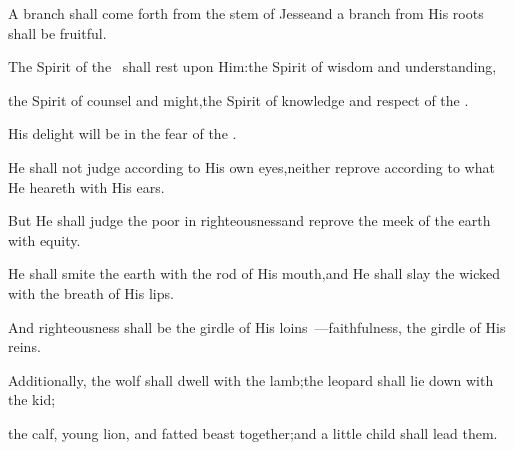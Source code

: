 
\begin{inparaenum}
  \pa{} A branch shall come forth from the stem of Jesse\pa{}and a branch from His roots shall be fruitful.%

  \pa{} The Spirit of the \lord\ shall rest upon Him:\pa{}the Spirit of wisdom and understanding,%

  \pa{}the Spirit of counsel and might,\pa{}the Spirit of knowledge and respect of the \lord.%

  \pa{} His delight will be in the fear of the \lord.%

  \pa{}He shall not judge according to His own eyes,\pa{}neither reprove according to what He heareth with His ears.%

  \pa{} But He shall judge the poor in righteousness\pa{}and reprove the meek of the earth with equity.%

  \pa{}He shall smite the earth with the rod of His mouth,\pa{}and He shall slay the wicked with the breath of His lips.%

  \pa{} And righteousness shall be the girdle of His loins~---\pa{}faithfulness, the girdle of His reins.%

  \pa{} Additionally, the wolf shall dwell with the lamb;\pa{}the leopard shall lie down with the kid;%

  \pa{}the calf, young lion, and fatted beast together;\pa{}and a little child shall lead them.%
\end{inparaenum}
